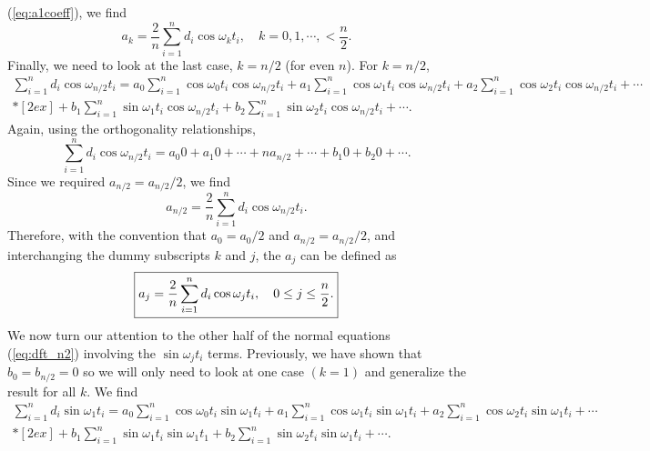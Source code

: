 (\ref{eq:a1coeff}), we find
\begin{equation}
a_k = \frac{2}{n} \displaystyle \sum^n_{i=1} d_i \cos \omega_{k} t_i, \quad k=0, 1, \cdots, < \frac{n}{2}.
\end{equation}
Finally, we need to look at the last case, $k = n/2$ (for even $n$).  For $k = n/2$,
\begin{equation}
\begin{array}{c}
\displaystyle \sum^n_{i=1} d_i \cos \omega_{n/2} t_i = a_0 \sum^n_{i=1} \cos \omega_{0} t_i
\cos \omega_{n/2} t_i + a_1 \sum^n_{i=1}
\cos \omega_{1} t_i      \cos \omega_{n/2} t_i + a_2 
\sum^n_{i=1} \cos \omega_{2} t_i
 \cos \omega_{n/2} t_i + \cdots \\*[2ex]
+ b_1 \displaystyle \sum^n_{i=1} \sin \omega_1 t_i \cos \omega _{n/2}t_i + b_2 
\displaystyle \sum^n_{i=1} \sin \omega_2 t_i \cos \omega_{n/2} t_i + \cdots.
\end{array}
\end{equation}
Again, using the orthogonality relationships,
\begin{equation}
\displaystyle \sum^n_{i=1} d_i \cos \omega _{n/2} t_i = a_0 0 + a_1 0 + \cdots + na_{n/2} + \cdots + b_1 0 + b_2 0 + \cdots .
\end{equation}
Since we required $a_{n/2} = a_{n/2}/2$, we find
\begin{equation}
a_{n/2} = \frac{2}{n} \displaystyle \sum^n_{i=1} d_i \cos \omega_{n/2} t_i.
\end{equation}
Therefore, with the convention that $a_0 = a_0/2$ and $a_{n/2} = a_{n/2}/2$, and interchanging the dummy subscripts
$k$ and $j$, the $a_j$ can be defined as
\begin{equation}
	\index{Discrete cosine transform}
	\label{eq:DCT}
\boxed{a_j = \frac{2}{n} \displaystyle \sum^n_{i=1} d_i \cos \omega_j t_i, \quad 0 \leq j \leq \frac{n}{2}.}
\end{equation}
We now turn our attention to the other half of the normal equations (\ref{eq:dft_n2}) involving the $\sin \omega _j t_i$  
terms.  Previously, we have shown that $b_0 = b_{n/2} = 0$ so we will only need to look at one case $(k = 
1)$ and generalize the result for all $k$.  We find
\begin{equation}
\begin{array}{c}
\displaystyle \sum^n_{i=1} d_i \sin \omega_{1} t_i = a_0 \sum^n_{i=1} \cos \omega_{0} t_i
\sin \omega_{1} t_i + a_1 \sum^n_{i=1}
\cos \omega_{1} t_i \sin \omega_{1} t_i + a_2 \sum^n_{i=1} \cos \omega_{2} t_i
  \sin \omega_{1} t_i  + \cdots  \\*[2ex]
+ b_1 \displaystyle \sum^n_{i=1} \sin \omega_1 t_i \sin \omega _{1} t_1 +  b_2 
\displaystyle \sum^n_{i=1} \sin \omega_2 t_i \sin \omega_{1} t_i + \cdots.
\end{array}
\end{equation}
